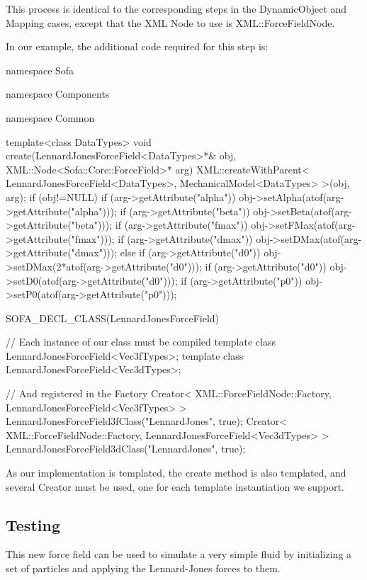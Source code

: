 This process is identical to the corresponding steps in the DynamicObject and Mapping cases, except that the XML Node to use is XML::ForceFieldNode.

In our example, the additional code required for this step is:
\begin{code_cpp}

namespace Sofa { namespace Components { namespace Common {

template<class DataTypes>
void create(LennardJonesForceField<DataTypes>*& obj, XML::Node<Sofa::Core::ForceField>* arg)
{
  XML::createWithParent< LennardJonesForceField<DataTypes>, MechanicalModel<DataTypes> >(obj, arg);
  if (obj!=NULL)
  {
    if (arg->getAttribute("alpha"))  obj->setAlpha(atof(arg->getAttribute("alpha")));
    if (arg->getAttribute("beta"))  obj->setBeta(atof(arg->getAttribute("beta")));
    if (arg->getAttribute("fmax"))  obj->setFMax(atof(arg->getAttribute("fmax")));
    if (arg->getAttribute("dmax"))  obj->setDMax(atof(arg->getAttribute("dmax")));
    else if (arg->getAttribute("d0"))  obj->setDMax(2*atof(arg->getAttribute("d0")));
    if (arg->getAttribute("d0"))  obj->setD0(atof(arg->getAttribute("d0")));
    if (arg->getAttribute("p0"))  obj->setP0(atof(arg->getAttribute("p0")));
  }
} } } }

SOFA_DECL_CLASS(LennardJonesForceField)

// Each instance of our class must be compiled
template class LennardJonesForceField<Vec3fTypes>;
template class LennardJonesForceField<Vec3dTypes>;

// And registered in the Factory
Creator< XML::ForceFieldNode::Factory, LennardJonesForceField<Vec3fTypes> > LennardJonesForceField3fClass("LennardJones", true);
Creator< XML::ForceFieldNode::Factory, LennardJonesForceField<Vec3dTypes> > LennardJonesForceField3dClass("LennardJones", true);
\end{code_cpp}

As our implementation is templated, the create method is also templated, and several Creator must be used, one for each template instantiation we support.

\subsection{Testing}

This new force field can be used to simulate a very simple fluid by initializing a set of particles and applying the Lennard-Jones forces to them.

